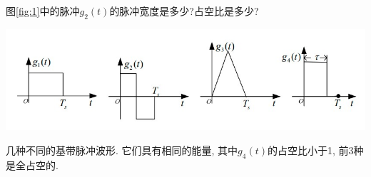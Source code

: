 图\ref{fig:1}中的脉冲$g_2(t)$的脉冲宽度是多少?占空比是多少?

\begin{myfigure}
    \includegraphics[scale=0.65]{image/1.jpg}
    \caption{几种不同的基带脉冲波形. 它们具有相同的能量, 其中$g_4(t)$的占空比小于1, 前3种是全占空的.}
    \label{fig:1}
\end{myfigure}

\begin{solution}
\end{solution}
